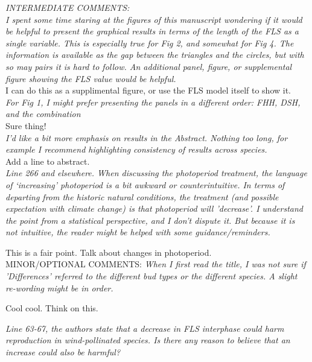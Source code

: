 \documentclass[11pt]{article}
\begin{document}
\emph{INTERMEDIATE COMMENTS:}\\
\emph{I spent some time staring at the figures of this manuscript wondering if it would be helpful to present the graphical results in terms of the length of the FLS as a single variable. This is especially true for Fig 2, and somewhat for Fig 4. The information is available as the gap between the triangles and the circles, but with so may pairs it is hard to follow. An additional panel, figure, or supplemental figure showing the FLS value would be helpful.}\\

I can do this as a supplimental figure, or use the FLS model itself to show it.\\

\emph{For Fig 1, I might prefer presenting the panels in a different order: FHH, DSH, and the combination}\\

Sure thing!\\

\emph{I’d like a bit more emphasis on results in the Abstract. Nothing too long, for example I recommend highlighting consistency of results across species.}\\

Add a line to abstract.\\

\emph{Line 266 and elsewhere. When discussing the photoperiod treatment, the language of ‘increasing’ photoperiod is a bit awkward or counterintuitive. In terms of departing from the historic natural conditions, the treatment (and possible expectation with climate change) is that photoperiod will 'decrease'. I understand the point from a statistical perspective, and I don’t dispute it. But because it is not intuitive, the reader might be helped with some guidance/reminders.}

This is a fair point. Talk about changes in photoperiod.\\


MINOR/OPTIONAL COMMENTS:
\emph{When I first read the title, I was not sure if 'Differences' referred to the different bud types or the different species. A slight re-wording might be in order.}

Cool cool. Think on this.

\emph{Line 63-67, the authors state that a decrease in FLS interphase could harm reproduction in wind-pollinated species. Is there any reason to believe that an increase could also be harmful?}
\end{document}

